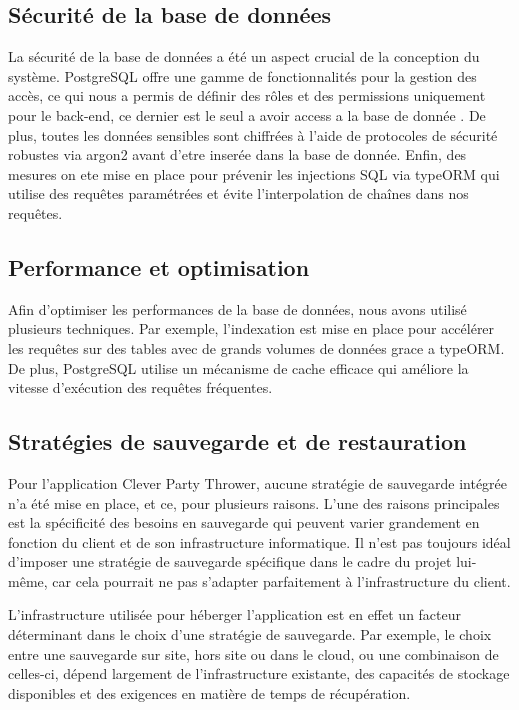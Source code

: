 \subsection{Sécurité de la base de données}\label{subsec:database-security}
La sécurité de la base de données a été un aspect crucial de la conception du système.
PostgreSQL offre une gamme de fonctionnalités pour la gestion des accès, ce qui nous a permis de définir des rôles et des permissions uniquement pour le back-end, ce dernier est le seul a avoir access a la base de donnée .
De plus, toutes les données sensibles sont chiffrées à l'aide de protocoles de sécurité robustes via argon2 avant d'etre inserée dans la base de donnée.
Enfin, des mesures on ete mise en place pour prévenir les injections SQL via typeORM qui utilise des requêtes paramétrées et évite l'interpolation de chaînes dans nos requêtes.

\subsection{Performance et optimisation}\label{subsec:performance-optimization}
Afin d'optimiser les performances de la base de données, nous avons utilisé plusieurs techniques.
Par exemple, l'indexation est mise en place pour accélérer les requêtes sur des tables avec de grands volumes de données grace a typeORM\@.
De plus, PostgreSQL utilise un mécanisme de cache efficace qui améliore la vitesse d'exécution des requêtes fréquentes.

\subsection{Stratégies de sauvegarde et de restauration}\label{subsec:backup-restore}
Pour l'application Clever Party Thrower, aucune stratégie de sauvegarde intégrée n'a été mise en place, et ce, pour plusieurs raisons.
L'une des raisons principales est la spécificité des besoins en sauvegarde qui peuvent varier grandement en fonction du client et de son infrastructure informatique.
Il n'est pas toujours idéal d'imposer une stratégie de sauvegarde spécifique dans le cadre du projet lui-même, car cela pourrait ne pas s'adapter parfaitement à l'infrastructure du client.

L'infrastructure utilisée pour héberger l'application est en effet un facteur déterminant dans le choix d'une stratégie de sauvegarde.
Par exemple, le choix entre une sauvegarde sur site, hors site ou dans le cloud, ou une combinaison de celles-ci, dépend largement de l'infrastructure existante,
des capacités de stockage disponibles et des exigences en matière de temps de récupération.

